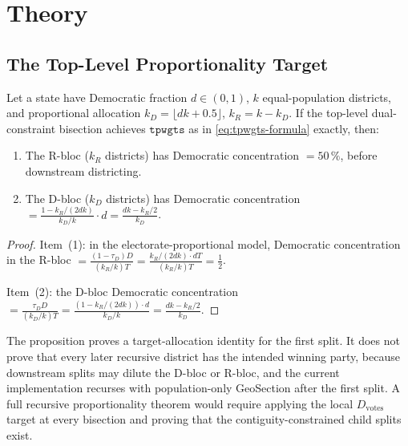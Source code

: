 \section{Theory}
\label{sec:theory}

\subsection{The Top-Level Proportionality Target}

\begin{proposition}
\label{prop:top-split}
Let a state have Democratic fraction $d \in (0,1)$, $k$ equal-population
districts, and proportional allocation $k_D = \lfloor dk + 0.5 \rfloor$,
$k_R = k - k_D$.
If the top-level dual-constraint bisection achieves $\mathtt{tpwgts}$ as in
\eqref{eq:tpwgts-formula} exactly, then:
\begin{enumerate}
  \item The R-bloc ($k_R$ districts) has Democratic concentration $= 50\,\%$,
        before downstream districting.
  \item The D-bloc ($k_D$ districts) has Democratic concentration
        $= \frac{1 - k_R/(2dk)}{k_D/k} \cdot d = \frac{dk - k_R/2}{k_D}$.
\end{enumerate}
\end{proposition}

\begin{proof}
Item~(1): in the electorate-proportional model, Democratic concentration in
the R-bloc $= \frac{(1-\tau_D) D}{(k_R/k) T}
= \frac{k_R/(2dk) \cdot dT}{(k_R/k) T} = \frac{1}{2}$. \checkmark

Item~(2): the D-bloc Democratic concentration
$= \frac{\tau_D D}{(k_D/k) T} = \frac{(1 - k_R/(2dk)) \cdot d}{k_D/k}
= \frac{dk - k_R/2}{k_D}$.
\end{proof}

\begin{remark}
The proposition proves a target-allocation identity for the first split. It
does not prove that every later recursive district has the intended winning
party, because downstream splits may dilute the D-bloc or R-bloc, and the
current implementation recurses with population-only GeoSection after the first
split. A full recursive proportionality theorem would require applying the
local $D_{\text{votes}}$ target at every bisection and proving that the
contiguity-constrained child splits exist.
\end{remark}

